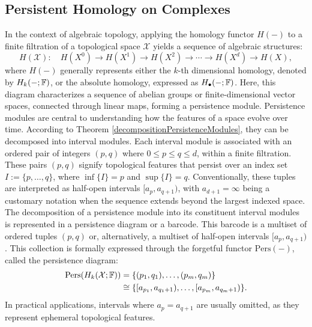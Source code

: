 \subsection{Persistent Homology on Complexes}
\label{PersistentHomologyonComplexes}
In the context of algebraic topology, applying the homology functor $H(-)$
to a finite filtration of a topological space $\mathcal{X}$ yields a sequence of algebraic structures:
\begin{equation}
	H(\mathcal{X}): \quad H(X^0) \rightarrow H(X^{1}) \to H(X^{2}) \to \cdots
	\to H(X^{d}) \rightarrow H(X),
\end{equation}
where $H(-)$ generally represents either the $k$-th dimensional
homology, denoted by $H_{k}(-;{\mathbb{F}})$, or the absolute homology, expressed as $H
_{\bullet}(-;{\mathbb{F}})$. Here, this diagram characterizes a sequence of abelian
groups or finite-dimensional vector spaces, connected through linear maps, forming a persistence module. Persistence modules are central to understanding how the features of a space evolve
over time. According to Theorem \ref{decompositionPersistenceModules}, they can be decomposed into interval modules. Each interval module is associated with an
ordered pair of integers $(p,q)$ where $0 \leq p \leq q \leq d$, within a finite
filtration. These pairs $(p,q)$ signify topological features that persist over an
index set $I := \{p, \ldots, q\}$, where $\inf\{I\} = p$ and $\sup\{I\} = q$. Conventionally,
these tuples are interpreted as half-open intervals $[a_{p}, a_{q+1})$, with $a_{d+1}
= \infty$ being a customary notation when the sequence extends beyond the largest
indexed space. The decomposition of a persistence module into its constituent interval modules is
represented in a persistence diagram or a barcode. This barcode is a multiset of ordered tuples $(p,q)$ or, alternatively, a multiset
of half-open intervals $[a_{p}, a_{q+1})$. This collection is formally expressed
through the forgetful functor $\mathrm{Pers}(-)$, called the persistence diagram:
\begin{align}
    \mathrm{Pers}(H_k(\mathcal{X};{\mathbb{F}})) & = \{(p_{1},q_{1}), \ldots, (p_{m},q_{m})\}                    \\
                                           & \cong \{[a_{p_1}, a_{q_1+1}), \ldots, [a_{p_m}, a_{q_m+1})\}.
\end{align}
In practical applications, intervals where $a_{p} = a_{q+1}$ are usually omitted,
as they represent ephemeral topological features.

